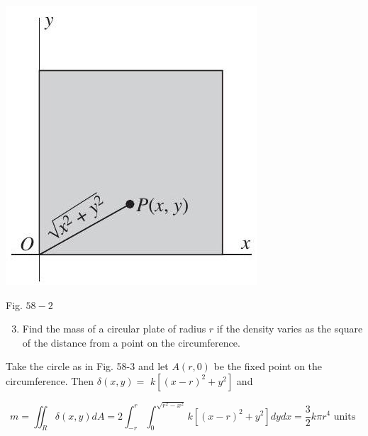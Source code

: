\documentclass[10pt]{article}
\begin{document}
\begin{center}
\includegraphics[max width=\textwidth]{2024_04_20_fe2e8e718cc0fcd63d1bg-13(1)}
\end{center}

Fig. $58-2$

\begin{enumerate}
  \setcounter{enumi}{2}
  \item Find the mass of a circular plate of radius $r$ if the density varies as the square of the distance from a point on the circumference.
\end{enumerate}

Take the circle as in Fig. 58-3 and let $A(r, 0)$ be the fixed point on the circumference. Then $\delta(x, y)=$ $k\left[(x-r)^{2}+y^{2}\right]$ and

$$
m=\iint_{R} \delta(x, y) d A=2 \int_{-r}^{r} \int_{0}^{\sqrt{r^{2}-x^{2}}} k\left[(x-r)^{2}+y^{2}\right] d y d x=\frac{3}{2} k \pi r^{4} \text { units }
$$
\end{document}
